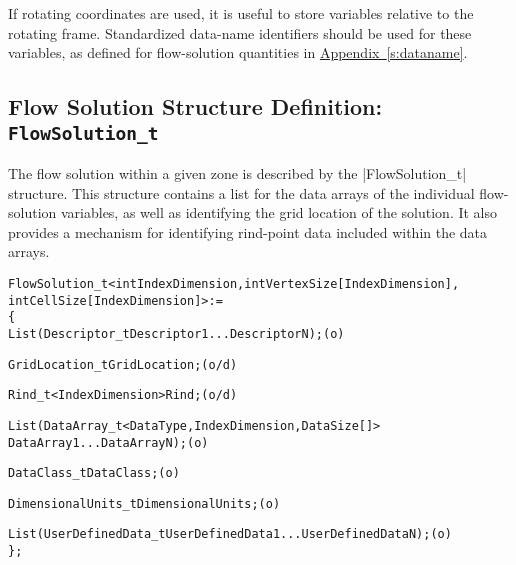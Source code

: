 If rotating coordinates are used, it is useful to store variables
relative to the rotating frame.
Standardized data-name identifiers should be used for these variables,
as defined for flow-solution quantities in
\hyperref[s:dataname]{Appendix~\ref*{s:dataname}}.

\subsection{Flow Solution Structure Definition: \texttt{FlowSolution\_t}} 
\label{s:FlowSolution}

The flow solution within a given zone is described by the |FlowSolution_t|
structure.  This structure contains a list for the data arrays of the
individual flow-solution variables, as well as identifying the grid location
of the solution.  It also provides a mechanism for identifying rind-point
data included within the data arrays.

\begin{alltt}
  FlowSolution\_t< int IndexDimension, int VertexSize[IndexDimension], 
                  int CellSize[IndexDimension] > :=
    \{
    List( Descriptor\_t Descriptor1 ... DescriptorN ) ;                      (o)

    GridLocation\_t GridLocation ;                                           (o/d)

    Rind\_t<IndexDimension> Rind ;                                           (o/d)

    List( DataArray\_t<DataType, IndexDimension, DataSize[]> 
          DataArray1 ... DataArrayN ) ;                                     (o)

    DataClass\_t DataClass ;                                                 (o)
    
    DimensionalUnits\_t DimensionalUnits ;                                   (o)

    List( UserDefinedData\_t UserDefinedData1 ... UserDefinedDataN ) ;       (o)
    \} ;
\end{alltt}

